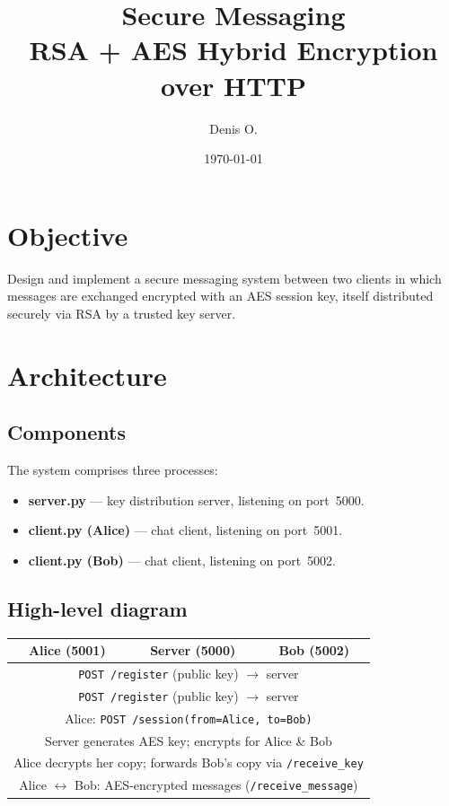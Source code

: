 \documentclass[12pt,a4paper]{article}
\title{\textbf{Secure Messaging}\\
       \large RSA + AES Hybrid Encryption over HTTP}
\author{Denis O.}
\date{\today}
\begin{document}
\maketitle


\section{Objective}

Design and implement a secure messaging system between two clients in which messages are exchanged encrypted with an AES session key, itself distributed securely via RSA by a trusted key server.

\section{Architecture}

\subsection{Components}

The system comprises three processes:

\begin{itemize}
  \item \textbf{server.py} — key distribution server, listening on port~5000.
  \item \textbf{client.py (Alice)} — chat client, listening on port~5001.
  \item \textbf{client.py (Bob)} — chat client, listening on port~5002.
\end{itemize}

\subsection{High-level diagram}

\begin{center}
\begin{tabular}{ccc}
\toprule
\textbf{Alice (5001)} & \textbf{Server (5000)} & \textbf{Bob (5002)} \\
\midrule
\multicolumn{3}{c}{\texttt{POST /register} (public key) \(\rightarrow\) server} \\
\multicolumn{3}{c}{\texttt{POST /register} (public key) \(\rightarrow\) server} \\
\multicolumn{3}{c}{Alice: \texttt{POST /session(from=Alice, to=Bob)}} \\
\multicolumn{3}{c}{Server generates AES key; encrypts for Alice \& Bob} \\
\multicolumn{3}{c}{Alice decrypts her copy; forwards Bob's copy via \texttt{/receive\_key}} \\
\multicolumn{3}{c}{Alice \(\leftrightarrow\) Bob: AES-encrypted messages (\texttt{/receive\_message})} \\
\bottomrule
\end{tabular}
\end{center}
\end{document}

